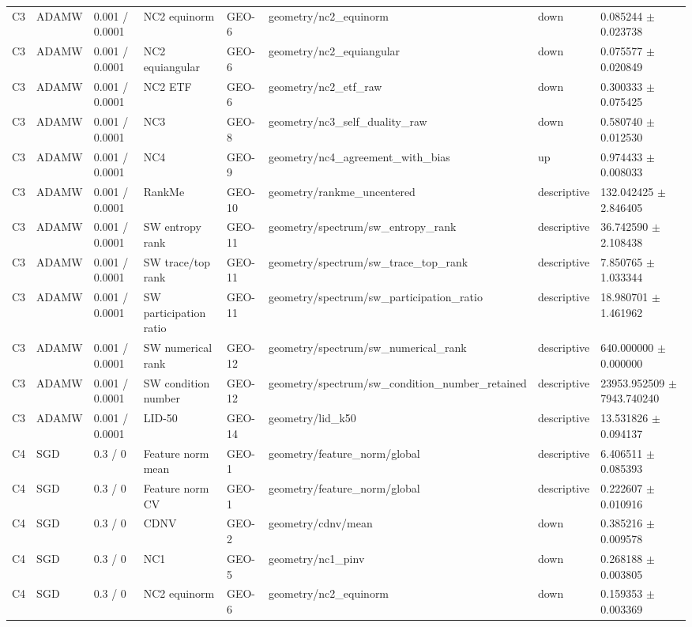 \begin{longtable}{llllllll}
C3 & ADAMW & 0.001 / 0.0001 & NC2 equinorm & GEO-6 & geometry/nc2\_equinorm & down & 0.085244 $\pm$ 0.023738 \\
C3 & ADAMW & 0.001 / 0.0001 & NC2 equiangular & GEO-6 & geometry/nc2\_equiangular & down & 0.075577 $\pm$ 0.020849 \\
C3 & ADAMW & 0.001 / 0.0001 & NC2 ETF & GEO-6 & geometry/nc2\_etf\_raw & down & 0.300333 $\pm$ 0.075425 \\
C3 & ADAMW & 0.001 / 0.0001 & NC3 & GEO-8 & geometry/nc3\_self\_duality\_raw & down & 0.580740 $\pm$ 0.012530 \\
C3 & ADAMW & 0.001 / 0.0001 & NC4 & GEO-9 & geometry/nc4\_agreement\_with\_bias & up & 0.974433 $\pm$ 0.008033 \\
C3 & ADAMW & 0.001 / 0.0001 & RankMe & GEO-10 & geometry/rankme\_uncentered & descriptive & 132.042425 $\pm$ 2.846405 \\
C3 & ADAMW & 0.001 / 0.0001 & SW entropy rank & GEO-11 & geometry/spectrum/sw\_entropy\_rank & descriptive & 36.742590 $\pm$ 2.108438 \\
C3 & ADAMW & 0.001 / 0.0001 & SW trace/top rank & GEO-11 & geometry/spectrum/sw\_trace\_top\_rank & descriptive & 7.850765 $\pm$ 1.033344 \\
C3 & ADAMW & 0.001 / 0.0001 & SW participation ratio & GEO-11 & geometry/spectrum/sw\_participation\_ratio & descriptive & 18.980701 $\pm$ 1.461962 \\
C3 & ADAMW & 0.001 / 0.0001 & SW numerical rank & GEO-12 & geometry/spectrum/sw\_numerical\_rank & descriptive & 640.000000 $\pm$ 0.000000 \\
C3 & ADAMW & 0.001 / 0.0001 & SW condition number & GEO-12 & geometry/spectrum/sw\_condition\_number\_retained & descriptive & 23953.952509 $\pm$ 7943.740240 \\
C3 & ADAMW & 0.001 / 0.0001 & LID-50 & GEO-14 & geometry/lid\_k50 & descriptive & 13.531826 $\pm$ 0.094137 \\
C4 & SGD & 0.3 / 0 & Feature norm mean & GEO-1 & geometry/feature\_norm/global & descriptive & 6.406511 $\pm$ 0.085393 \\
C4 & SGD & 0.3 / 0 & Feature norm CV & GEO-1 & geometry/feature\_norm/global & descriptive & 0.222607 $\pm$ 0.010916 \\
C4 & SGD & 0.3 / 0 & CDNV & GEO-2 & geometry/cdnv/mean & down & 0.385216 $\pm$ 0.009578 \\
C4 & SGD & 0.3 / 0 & NC1 & GEO-5 & geometry/nc1\_pinv & down & 0.268188 $\pm$ 0.003805 \\
C4 & SGD & 0.3 / 0 & NC2 equinorm & GEO-6 & geometry/nc2\_equinorm & down & 0.159353 $\pm$ 0.003369 \\

\end{longtable}
